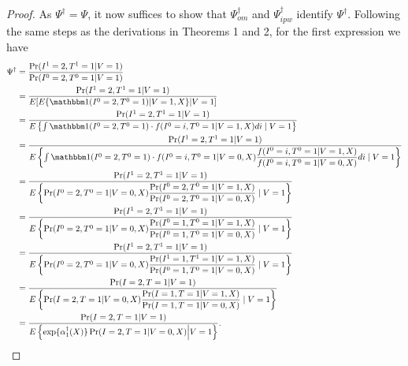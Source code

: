 \documentclass{article}
\begin{document}
\begin{proof}
    As $\Psi^\dagger = \Psi$, it now suffices to show that $\Psi^\dagger_{om}$ and $\Psi^\dagger_{ipw}$ identify $\Psi^\dagger$. Following the same steps as the derivations in Theorems 1 and 2, for the first expression we have 
    \begin{align*}
    \Psi^\dagger &= \dfrac{\Pr(I^1=2, T^1 = 1|V=1)}{\Pr(I^0=2, T^0 = 1|V=1)} \\
    &= \dfrac{\Pr(I^1=2, T^1 = 1|V=1)}{E[E\{\mathbbm 1 (I^0 = 2, T^0 = 1) | V = 1, X\} | V = 1]} \\
    &= \dfrac{\Pr(I^1=2, T^1 = 1|V=1)}{E\left\{\int \mathbbm 1 (I^0= 2, T^0 = 1) \cdot f(I^0 = i, T^0 = 1 | V = 1, X) di \mid  V = 1\right\}} \\
    &= \dfrac{\Pr(I^1=2, T^1 = 1|V=1)}{E\left\{\int \mathbbm 1 (I^0= 2, T^0 = 1) \cdot f(I^0 = i, T^0 = 1 | V = 0, X) \dfrac{f(I^0 = i, T^0 = 1 | V = 1, X)}{f(I^0 = i, T^0 = 1 | V = 0, X)}di \mid  V = 1\right\}} \\
    &= \dfrac{\Pr(I^1=2, T^1 = 1|V=1)}{E\left\{ \Pr(I^0 = 2, T^0 = 1 | V = 0, X) \dfrac{\Pr(I^0 = 2, T^0 = 1 | V = 1, X)}{\Pr(I^0 = 2, T^0 = 1 | V = 0, X)} \mid  V = 1\right\}} \\
    &= \dfrac{\Pr(I^1=2, T^1 = 1|V=1)}{E\left\{ \Pr(I^0 = 2, T^0 = 1 | V = 0, X) \dfrac{\Pr(I^0 = 1, T^0 = 1 | V = 1, X)}{\Pr(I^0 = 1, T^0 = 1 | V = 0, X)} \mid  V = 1\right\}} \\
    &= \dfrac{\Pr(I^1=2, T^1 = 1|V=1)}{E\left\{ \Pr(I^0 = 2, T^0 = 1 | V = 0, X) \dfrac{\Pr(I^1 = 1, T^1 = 1 | V = 1, X)}{\Pr(I^0 = 1, T^0 = 1 | V = 0, X)} \mid  V = 1\right\}} \\
    &= \dfrac{\Pr(I=2, T = 1|V=1)}{E\left\{ \Pr(I = 2, T = 1 | V = 0, X) \dfrac{\Pr(I = 1, T = 1 | V = 1, X)}{\Pr(I = 1, T = 1 | V = 0, X)} \mid  V = 1\right\}} \\
    &= \dfrac{\Pr(I = 2, T = 1 | V = 1)}{E\left\{ \exp\{\alpha^\dagger_1(X)\} \Pr(I = 2, T = 1 | V = 0, X) \Big| V = 1 \right\}}.
    \end{align*}


\end{proof}
\end{document}

